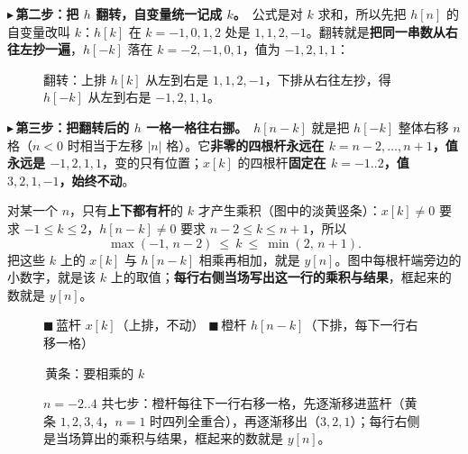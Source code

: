 \documentclass[UTF8,a4paper,11pt]{ctexart}
\newcommand{\barsat}[5]{%
  \foreach \v [count=\i from 0] in {#3}{%
    \pgfmathtruncatemacro{\kk}{#2+\i}%
    \draw[thick,#4] (\kk,#1) -- (\kk,#1+\v);
    \node[circle,fill=#4,inner sep=1.1pt] at (\kk,#1+\v) {};
    \ifnum\v>0 \def\barvside{south}\else\def\barvside{north}\fi
    \ifnum\kk<0
      \ifnum#5=1 \def\barhside{east}\else\def\barhside{west}\fi
    \else
      \ifnum#5=1 \def\barhside{west}\else\def\barhside{east}\fi
    \fi
    \edef\baranchor{\barvside\space\barhside}%
    \node[font=\scriptsize,#4,anchor=\baranchor,inner sep=0.8pt,fill=white] at (\kk,#1+\v) {$\v$};}}
\newcommand{\convrow}[4]{%
  \begin{scope}[shift={(0,#2)}]
    \pgfmathtruncatemacro{\kleft}{max(-1,#1-2)}%
    \pgfmathtruncatemacro{\kright}{min(2,#1+1)}%
    \foreach \k in {-4,...,5}{%
      \ifnum\k<\kleft\relax\else
        \ifnum\k>\kright\relax\else
          \fill[yellow!22,draw=orange!35,very thin] (\k-0.5,-4.6) rectangle (\k+0.5,5.0);
        \fi
      \fi
      \draw[very thin,gray!25,dashed] (\k,-4.6) -- (\k,5.0);}
    \draw[thin,gray!55] (-4.7,1.5) -- (5.9,1.5);
    \draw[thin,gray!55] (-4.7,-3.0) -- (5.9,-3.0);
    \barsat{1.5}{-1}{3,2,1,-1}{blue!60!black}{1}
    \barsat{-3.0}{#1-2}{-1,2,1,1}{orange!85!black}{-1}
    \node[anchor=east,font=\footnotesize] at (-5.0,-0.6) {$n=#1$};
    \node[anchor=west,font=\footnotesize] at (6.4,1.1) {$y[#1]=#3$};
    \node[anchor=west,font=\footnotesize] at (6.4,-1.1) {$\quad=#4$};
  \end{scope}}
\newcommand{\convaxis}[1]{%
  \draw[->,thin] (-4.7,#1-4.9) -- (6.0,#1-4.9) node[right,font=\tiny] {$k$};
  \foreach \k in {-4,...,5}{%
    \node[font=\tiny,gray!60!black,fill=white,inner sep=0.8pt] at (\k,#1-6.0) {$\k$};}}
\newcounter{ex}[section]
\newcommand{\point}[1]{\par\addvspace{1ex}\noindent\textcolor{ptteal}{$\blacktriangleright$\,\textbf{#1}}\ }
\renewcommand{\paragraph}[1]{\point{#1}}
\begin{document}
\paragraph{第二步：把 $h$ 翻转，自变量统一记成 $k$。}公式是对 $k$ 求和，所以先把 $h[n]$ 的自变量改叫 $k$：$h[k]$ 在 $k=-1,0,1,2$ 处是 $1,1,2,-1$。翻转就是\textbf{把同一串数从右往左抄一遍}，$h[-k]$ 落在 $k=-2,-1,0,1$，值为 $-1,2,1,1$：

\begin{figure}[H]
\centering
{}
\caption{翻转：上排 $h[k]$ 从左到右是 $1,1,2,-1$，下排从右往左抄，得 $h[-k]$ 从左到右是 $-1,2,1,1$。}
\end{figure}

\paragraph{第三步：把翻转后的 $h$ 一格一格往右挪。}$h[n-k]$ 就是把 $h[-k]$ 整体右移 $n$ 格（$n<0$ 时相当于左移 $|n|$ 格）。它\textbf{非零的四根杆永远在 $k=n-2,\dots,n+1$，值永远是 $-1,2,1,1$}，变的只有位置；$x[k]$ 的四根杆\textbf{固定在 $k=-1..2$，值 $3,2,1,-1$，始终不动}。

对某一个 $n$，只有\textbf{上下都有杆}的 $k$ 才产生乘积（图中的淡黄竖条）：$x[k]\ne0$ 要求 $-1\le k\le2$，$h[n-k]\ne0$ 要求 $n-2\le k\le n+1$，所以
\[\max(-1,\,n-2)\ \le\ k\ \le\ \min(2,\,n+1).\]
把这些 $k$ 上的 $x[k]$ 与 $h[n-k]$ 相乘再相加，就是 $y[n]$。图中每根杆端旁边的小数字，就是该 $k$ 上的取值；\textbf{每行右侧当场写出这一行的乘积与结果}，框起来的数就是 $y[n]$。

\begin{figure}[H]
\centering
{\footnotesize\textcolor{blue!60!black}{$\blacksquare$}\,蓝杆 $x[k]$（上排，不动）\quad
\textcolor{orange!85!black}{$\blacksquare$}\,橙杆 $h[n-k]$（下排，每下一行右移一格）\quad
\colorbox{yellow!22}{\strut\quad}\,黄条：要相乘的 $k$}\par\smallskip
{}
\caption{$n=-2..4$ 共七步：橙杆每往下一行右移一格，先逐渐移进蓝杆（黄条 $1,2,3,4$，$n=1$ 时四列全重合），再逐渐移出（$3,2,1$）；每行右侧是当场算出的乘积与结果，框起来的数就是 $y[n]$。}
\end{figure}
\end{document}
